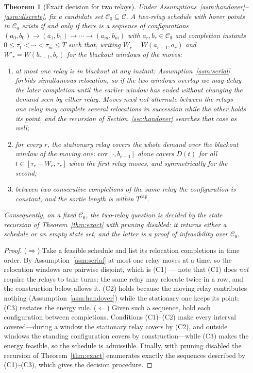 \documentclass[11pt]{article}
\theoremstyle{dshplain}
\newtheorem{theorem}{Theorem}
\theoremstyle{dshdefn}
\begin{document}
\begin{theorem}[Exact decision for two relays]
\label{thm:two}
Under Assumptions~\ref{asm:handover}--\ref{asm:discrete}, fix a candidate set
$\mathcal{C}_0\subseteq\mathcal{C}$. A two-relay schedule with hover points in
$\mathcal{C}_0$ exists \emph{if and only if} there is a sequence of
configurations $(a_0,b_0)\to(a_1,b_1)\to\cdots\to(a_m,b_m)$ with
$a_r,b_r\in\mathcal{C}_0$ and completion instants
$0\le\tau_1<\cdots<\tau_m\le T$ such that, writing $W_r=W(a_{r-1},a_r)$ and
$W'_r=W(b_{r-1},b_r)$ for the blackout windows of the moves:
\begin{enumerate}[leftmargin=1.8em,itemsep=2pt]
\item[(C1)] at most one relay is in blackout at any instant:
  Assumption~\ref{asm:serial} forbids simultaneous relocation, so if the two
  windows overlap we may delay the later completion until the earlier window has
  ended without changing the demand seen by either relay. Moves need \emph{not}
  alternate between the relays --- one relay may complete several relocations in
  succession while the other holds its point, and the recursion of
  Section~\ref{sec:handover} searches that case as well;
\item[(C2)] for every $r$, the \emph{stationary} relay covers the whole demand
  over the blackout window of the moving one: $\mathrm{cov}[\cdot,b_{r-1}]$
  alone covers $D(t)$ for all $t\in[\tau_r-W_r,\tau_r]$ when the first relay
  moves, and symmetrically for the second;
\item[(C3)] between two consecutive completions of the same relay the
  configuration is constant, and the sortie length is within $T^{\mathrm{cap}}$.
\end{enumerate}
Consequently, on a fixed $\mathcal{C}_0$, the two-relay question is decided by
the state recursion of Theorem~\ref{thm:exact} with pruning disabled: it returns
either a schedule or an empty state set, and the latter is a proof of
infeasibility over $\mathcal{C}_0$.
\end{theorem}
\begin{proof}
($\Rightarrow$) Take a feasible schedule and list its relocation completions in
time order. By Assumption~\ref{asm:serial} at most one relay moves at a time, so
the relocation windows are pairwise disjoint, which is (C1) --- note that (C1)
does \emph{not} require the relays to take turns: the same relay may relocate
twice in a row, and the construction below allows it. (C2) holds
because the moving relay contributes nothing (Assumption~\ref{asm:handover})
while the stationary one keeps its point; (C3) restates the energy rule.
($\Leftarrow$) Given such a sequence, hold each configuration between
completions. Conditions (C1)--(C2) make every interval covered---during a window
the stationary relay covers by (C2), and outside windows the standing
configuration covers by construction---while (C3) makes the energy feasible, so
the schedule is admissible. Finally, with pruning disabled the recursion of
Theorem~\ref{thm:exact} enumerates exactly the sequences described by
(C1)--(C3), which gives the decision procedure.
\end{proof}
\end{document}
